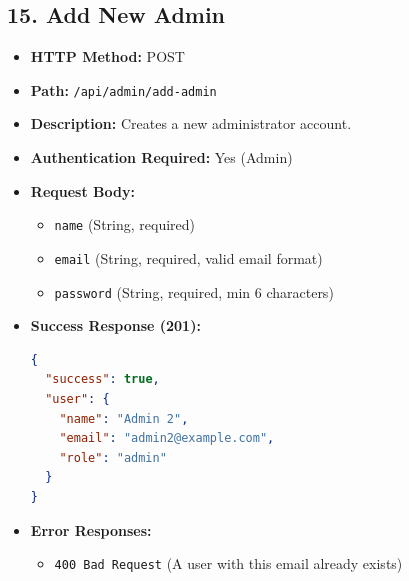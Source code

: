 \documentclass[12pt,a4paper]{article}
\begin{document}
\subsection{15. Add New Admin}
\begin{itemize}
    \item \textbf{HTTP Method:} POST
    \item \textbf{Path:} \texttt{/api/admin/add-admin}
    \item \textbf{Description:} Creates a new administrator account.
    \item \textbf{Authentication Required:} Yes (Admin)
    \item \textbf{Request Body:}
    \begin{itemize}
        \item \texttt{name} (String, required)
        \item \texttt{email} (String, required, valid email format)
        \item \texttt{password} (String, required, min 6 characters)
    \end{itemize}
    \item \textbf{Success Response (201):}
\begin{lstlisting}[language=json]
{
  "success": true,
  "user": {
    "name": "Admin 2",
    "email": "admin2@example.com",
    "role": "admin"
  }
}
\end{lstlisting}
    \item \textbf{Error Responses:}
    \begin{itemize}
        \item \texttt{400 Bad Request} (A user with this email already exists)
    \end{itemize}
\end{itemize}
\end{document}
